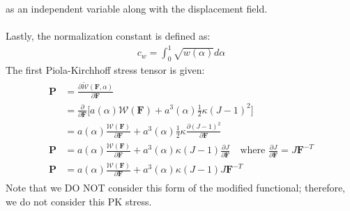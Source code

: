 \documentclass[12pt,3p]{article}
\numberwithin{equation}{section}
\begin{document}
as an independent variable along with the displacement field. \\ \\
Lastly, the normalization constant is defined as: 
\begin{align}\label{NormConst} %
c_w=\int_0^1\sqrt{w(\alpha)}d\alpha
\end{align}
The first Piola-Kirchhoff stress tensor is given: 
\begin{align}\label{eq_firstPK}
\begin{split}
\mathbf{P} &= \frac{\partial \tilde{\mathcal{W}}(\mathbf{F},\alpha)}{\partial \mathbf{F}} \\
		 &= \frac{\partial}{\partial \mathbf{F}} \bigg[ a(\alpha)\mathcal{W}(\mathbf{F}) + a^3(\alpha) \frac{1}{2}\kappa\left(J-1\right)^2 \bigg] \\
		 &= a(\alpha)\frac{\mathcal{W}(\mathbf{F})}{\partial \mathbf{F}} + a^3(\alpha) \frac{1}{2} \kappa \frac{\partial (J-1)^2}{\partial \mathbf{F}}  \\
\mathbf{P} &= a(\alpha)\frac{\mathcal{W}(\mathbf{F})}{\partial \mathbf{F}} + a^3(\alpha)\kappa\left(J-1\right)\frac{\partial J}{\partial \mathbf{F}} \quad \text{where } \frac{\partial J}{\partial \mathbf{F}} = J \mathbf{F}^{-T} \\
\mathbf{P} &= a(\alpha)\frac{\mathcal{W}(\mathbf{F})}{\partial \mathbf{F}} + a^3(\alpha)\kappa (J-1) J \mathbf{F}^{-T} 
\end{split}
\end{align}
Note that we DO NOT consider this form of the modified functional; therefore, we do not consider this PK stress. 

\end{document}
